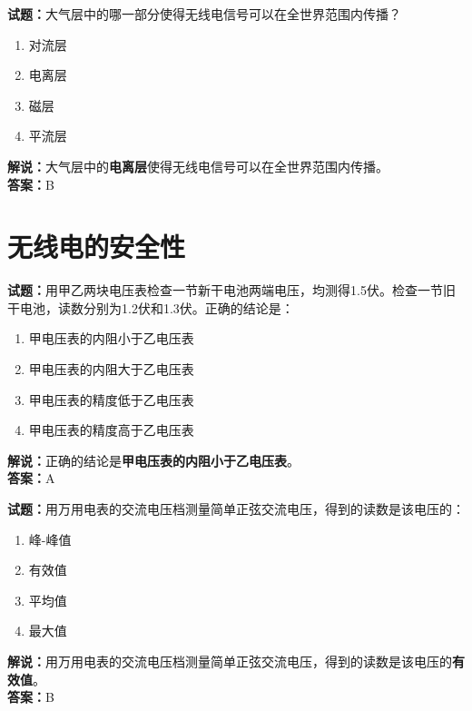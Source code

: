 \documentclass{ctexbook}
\begin{document}
\bigskip


\noindent\textbf{试题：}大气层中的哪一部分使得无线电信号可以在全世界范围内传播？
\begin{enumerate}[leftmargin=3em]
\item 对流层
\item 电离层
\item 磁层
\item 平流层
\end{enumerate}
\noindent\textbf{解说：}大气层中的\textbf{电离层}使得无线电信号可以在全世界范围内传播。\\\noindent\textbf{答案：}B






\chapter{无线电的安全性}


\bigskip



\noindent\textbf{试题：}用甲乙两块电压表检查一节新干电池两端电压，均测得1.5伏。检查一节旧干电池，读数分别为1.2伏和1.3伏。正确的结论是：
\begin{enumerate}[leftmargin=3em]
	\item 甲电压表的内阻小于乙电压表
	\item 甲电压表的内阻大于乙电压表
	\item 甲电压表的精度低于乙电压表
	\item 甲电压表的精度高于乙电压表
\end{enumerate}
\noindent\textbf{解说：}正确的结论是\textbf{甲电压表的内阻小于乙电压表}。\\\noindent\textbf{答案：}A


\bigskip



\noindent\textbf{试题：}用万用电表的交流电压档测量简单正弦交流电压，得到的读数是该电压的：
\begin{enumerate}[leftmargin=3em]
	\item 峰-峰值
	\item 有效值
	\item 平均值
	\item 最大值
\end{enumerate}
\noindent\textbf{解说：}用万用电表的交流电压档测量简单正弦交流电压，得到的读数是该电压的\textbf{有效值}。\\\noindent\textbf{答案：}B
\end{document}
